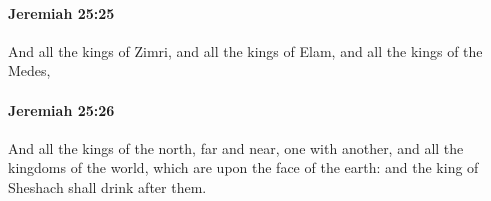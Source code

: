 		\paragraph{Jeremiah 25:25} %
			\label{JEREMIAH-25-25}

			And all the kings of Zimri, and all the kings of Elam, and all the kings of the Medes,


		\paragraph{Jeremiah 25:26} %
			\label{JEREMIAH-25-26}

			And all the kings of the north, far and near, one with another, and all the kingdoms of the world, which are upon the face of the earth: and the king of Sheshach shall drink after them.


